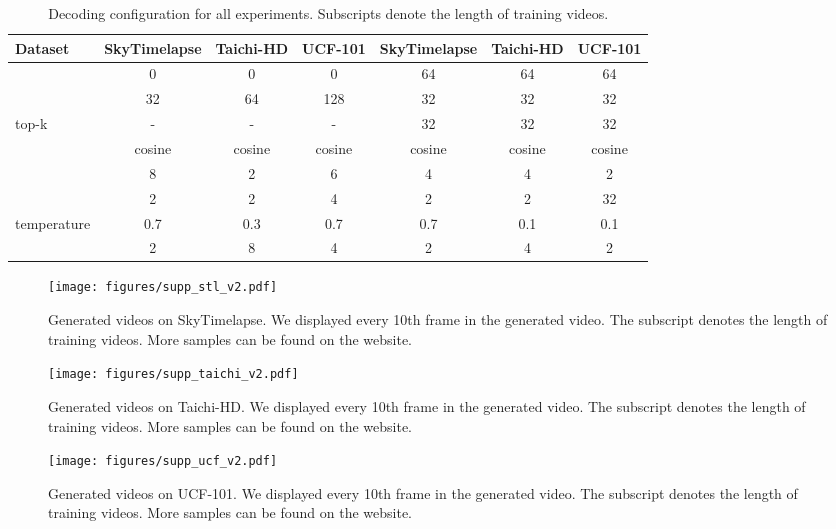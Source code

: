 \documentclass[10pt,twocolumn,letterpaper]{article}
\begin{document}
\begin{table*}[t]
    \centering
    \caption{Decoding configuration for all experiments. Subscripts denote the length of training videos.}
    \label{tab:inference_config}
    \begin{tabular}{l|cccccc}
    \toprule
    Dataset & SkyTimelapse & Taichi-HD & UCF-101 & SkyTimelapse & Taichi-HD& UCF-101\\
    \midrule
     & 0 & 0 & 0 & 64 & 64 & 64\\
    \hline
     & 32 & 64 & 128 & 32 & 32 & 32\\
    top-k & - & - & - & 32 & 32 & 32 \\
     & cosine & cosine & cosine & cosine & cosine & cosine \\
     & 8 & 2 & 6 & 4 & 4 & 2 \\
    \hline
      & 2 & 2 & 4 & 2 & 2 & 32 \\
    temperature  & 0.7 & 0.3 & 0.7 & 0.7 & 0.1 & 0.1 \\
      & 2 & 8 & 4 & 2 & 4 & 2 \\
    \bottomrule
    \end{tabular}
\end{table*}

\begin{figure*}[t]
    \centering
    \texttt{[image: figures/supp\_stl\_v2.pdf]}
    \caption{Generated videos on SkyTimelapse. We displayed every 10th frame in the generated video. The subscript denotes the length of training videos. More samples can be found on the website.}
    \label{fig:supp_stl}
\end{figure*}
\begin{figure*}[t]
    \centering
    \texttt{[image: figures/supp\_taichi\_v2.pdf]}
    \caption{Generated videos on Taichi-HD. We displayed every 10th frame in the generated video. The subscript denotes the length of training videos. More samples can be found on the website.}
    \label{fig:supp_taichi}
\end{figure*}
\begin{figure*}[t]
    \centering
    \texttt{[image: figures/supp\_ucf\_v2.pdf]}
    \caption{Generated videos on UCF-101. We displayed every 10th frame in the generated video. The subscript denotes the length of training videos. More samples can be found on the website.}
    \label{fig:supp_ucf}
\end{figure*} 
\end{document}
